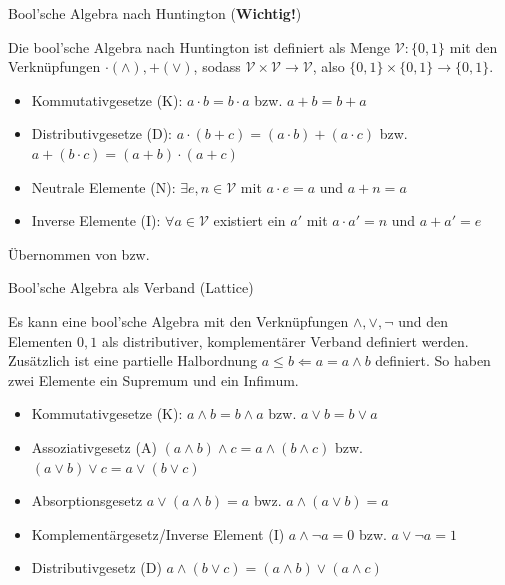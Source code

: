 \documentclass[12pt%
,aspectratio=169%
]{beamer}
\begin{document}
\begin{frame}{Bool'sche Algebra nach Huntington (\textbf{Wichtig!})}
\begin{definition}
Die bool'sche Algebra nach Huntington ist definiert als Menge $\mathcal{V}: \{0,1\}$ mit den Verknüpfungen $\cdot (\land), + (\lor)$, sodass $\mathcal{V} \times \mathcal{V} \to \mathcal{V}$, also $\{0,1\} \times \{0,1\} \to \{0,1\}$. 
\end{definition}
\begin{itemize}
	\item Kommutativgesetze (K): $a \cdot b = b \cdot a$ bzw. $a + b = b + a$
	\item Distributivgesetze (D): $a \cdot (b + c) = (a \cdot b) + (a \cdot c)$ bzw. $a + (b \cdot c) = (a + b) \cdot (a + c)$
	\item Neutrale Elemente (N): $ \exists e, n \in \mathcal{V}$ mit  $a \cdot e = a$ und $a + n = a$
	\item Inverse Elemente (I): $\forall a \in \mathcal{V}$ existiert ein $a'$ mit $a \cdot a'= n$ und $a + a' = e$
\end{itemize}
Übernommen von \cite{barnett2013boolean} bzw. \cite{hoffmann2020grundlagen}
\end{frame}

\begin{frame}{Bool'sche Algebra als Verband (Lattice)}
\begin{definition}
Es kann eine bool'sche Algebra mit den Verknüpfungen $\land, \lor, \neg$ und den Elementen $0,1$ als distributiver, komplementärer Verband definiert werden. Zusätzlich ist eine partielle Halbordnung $a \leq b \Leftarrow a = a \land b$ definiert. So haben zwei Elemente ein Supremum und ein Infimum.
\end{definition}
\begin{itemize}
	\item Kommutativgesetze (K): $a \land b = b \land a$ bzw. $a \lor b = b \lor a$
	\item Assoziativgesetz (A) $(a \land b ) \land c = a \land ( b \land c )$ bzw. $(a \lor b ) \lor c = a \lor ( b \lor c )$
	\item Absorptionsgesetz $a\lor(a\land b)=a$ bwz. $a\land (a\lor b)=a$
	\item Komplementärgesetz/Inverse Element (I) $a\land\neg a=0$ bzw. $a\lor\neg a=1$
	\item Distributivgesetz (D) $a \land ( b \lor c ) = ( a \land b ) \lor ( a \land c )$
\end{itemize}
\cite{sasao1999lattice}
\end{frame}
\end{document}
